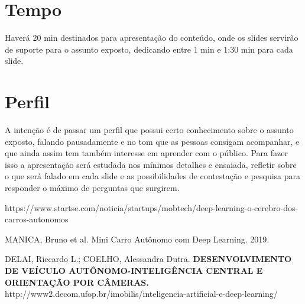 \documentclass[12pt,a4paper]{article}
\begin{document}
    

    \section{Tempo}
    \par Haverá 20 min destinados para apresentação do conteúdo, onde os slides servirão de suporte para o assunto exposto, dedicando entre 1 min e 1:30 min para cada slide.  
    
    \section{Perfil}
    \par A intenção é de passar um perfil que possui certo conhecimento sobre o assunto exposto, falando pausadamente e no tom que as pessoas consigam acompanhar, e que ainda assim tem também interesse em aprender com o público. Para fazer isso a apresentação será estudada nos mínimos detalhes e ensaiada, refletir sobre o que será falado em cada slide e as possibilidades de contestação e pesquisa para responder o máximo de perguntas que surgirem.


     
    \begin{thebibliography}{BIBLIOGRAFIA}

         https://www.startse.com/noticia/startups/mobtech/deep-learning-o-cerebro-dos-carros-autonomos
        
         MANICA, Bruno et al. Mini Carro Autônomo com Deep Learning. 2019.

         DELAI, Riccardo L.; COELHO, Alessandra Dutra. \textbf{DESENVOLVIMENTO DE VEÍCULO AUTÔNOMO-INTELIGÊNCIA CENTRAL E ORIENTAÇÃO POR CÂMERAS.}
         http://www2.decom.ufop.br/imobilis/inteligencia-artificial-e-deep-learning/

        
    
    \end{thebibliography}






\end{document}

